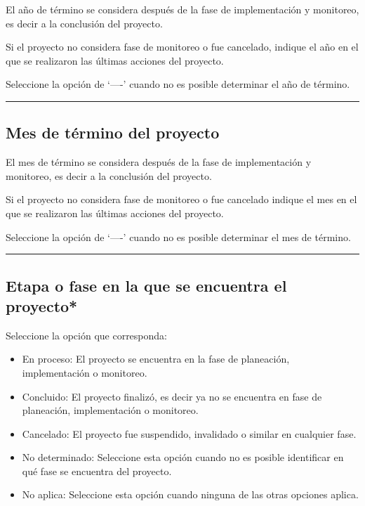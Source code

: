 \documentclass[
]{book}
\providecommand{\tightlist}{%
  \setlength{\itemsep}{0pt}\setlength{\parskip}{0pt}}
\begin{document}
El año de término se considera después de la fase de implementación y monitoreo, es decir a la conclusión del proyecto.

Si el proyecto no considera fase de monitoreo o fue cancelado, indique el año en el que se realizaron las últimas acciones del proyecto.

Seleccione la opción de `----' cuando no es posible determinar el año de término.

\begin{center}\rule{0.5\linewidth}{0.5pt}\end{center}

\hypertarget{mes-de-tuxe9rmino-del-proyecto}{%
\subsection*{Mes de término del proyecto}\label{mes-de-tuxe9rmino-del-proyecto}}

El mes de término se considera después de la fase de implementación y monitoreo, es decir a la conclusión del proyecto.

Si el proyecto no considera fase de monitoreo o fue cancelado indique el mes en el que se realizaron las últimas acciones del proyecto.

Seleccione la opción de `----' cuando no es posible determinar el mes de término.

\begin{center}\rule{0.5\linewidth}{0.5pt}\end{center}

\hypertarget{etapa-o-fase-en-la-que-se-encuentra-el-proyecto}{%
\subsection*{\texorpdfstring{{Etapa o fase en la que se encuentra el proyecto*}}{Etapa o fase en la que se encuentra el proyecto*}}\label{etapa-o-fase-en-la-que-se-encuentra-el-proyecto}}

Seleccione la opción que corresponda:

\begin{itemize}
\tightlist
\item
  En proceso: El proyecto se encuentra en la fase de planeación, implementación o monitoreo.
\item
  Concluido: El proyecto finalizó, es decir ya no se encuentra en fase de planeación, implementación o monitoreo.
\item
  Cancelado: El proyecto fue suspendido, invalidado o similar en cualquier fase.
\item
  No determinado: Seleccione esta opción cuando no es posible identificar en qué fase se encuentra del proyecto.
\item
  No aplica: Seleccione esta opción cuando ninguna de las otras opciones aplica.
\end{itemize}
\end{document}
